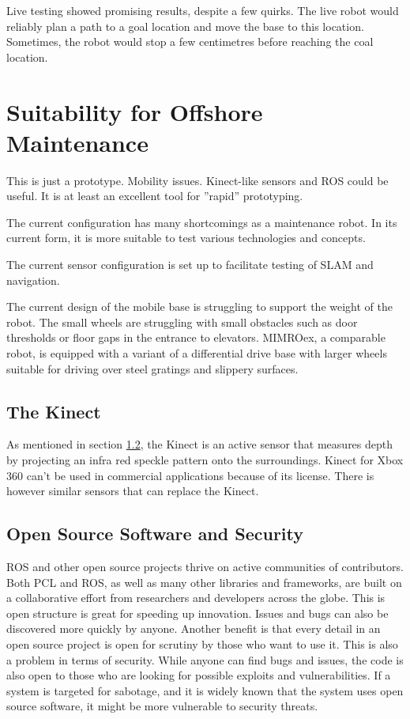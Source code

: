 Live testing showed promising results, despite a few quirks. The live robot would reliably plan a path to a goal location and move the base to this location. Sometimes, the robot would stop a few centimetres before reaching the coal location.

\section{Suitability for Offshore Maintenance}

This is just a prototype. Mobility issues.
Kinect-like sensors and ROS could be useful. It is at least an excellent tool for ''rapid'' prototyping.

The current configuration has many shortcomings as a maintenance robot. In its current form, it is more suitable to test various technologies and concepts. 

The current sensor configuration is set up to facilitate testing of \ac{SLAM} and navigation.

The current design of the mobile base is struggling to support the weight of the robot. The small wheels are struggling with small obstacles such as door thresholds or floor gaps in the entrance to elevators. \ac{MIMROex}, a comparable robot, is equipped with a variant of a differential drive base with larger wheels suitable for driving over steel gratings and slippery surfaces.



\subsection{The Kinect}

As mentioned in section \ref{}, the Kinect is an active sensor that measures depth by projecting an infra red speckle pattern onto the surroundings.  Kinect for Xbox 360 can't be used in commercial applications because of its license. There is however similar sensors that can replace the Kinect.

\subsection{Open Source Software and Security}

\ac{ROS} and other open source projects thrive on active communities of contributors. Both \ac{PCL} and \ac{ROS}, as well as many other libraries and frameworks, are built on a collaborative effort from researchers and developers across the globe. This is open structure is great for speeding up innovation. Issues and bugs can also be discovered more quickly by anyone. Another benefit is that every detail in an open source project is open for scrutiny by those who want to use it. This is also a problem in terms of security. While anyone can find bugs and issues, the code is also open to those who are looking for possible exploits and vulnerabilities. If a system is targeted for sabotage, and it is widely known that the system uses open source software, it might be more vulnerable to security threats.

